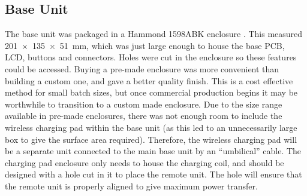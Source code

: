 \subsection{Base Unit}
The base unit was packaged in a Hammond 1598ABK enclosure \cite{hammond}. This measured \SI{201x135x51}{\milli\metre}, which was just large enough to house the base PCB, LCD, buttons and connectors. Holes were cut in the enclosure so these features could be accessed. Buying a pre-made enclosure was more convenient than building a custom one, and gave a better quality finish. This is a cost effective method for small batch sizes, but once commercial production begins it may be worthwhile to transition to a custom made enclosure. Due to the size range available in pre-made enclosures, there was not enough room to include the wireless charging pad within the base unit (as this led to an unnecessarily large box to give the surface area required). Therefore, the wireless charging pad will be a separate unit connected to the main base unit by an ``umbilical'' cable. The charging pad enclosure only needs to house the charging coil, and should be designed with a hole cut in it to place the remote unit. The hole will ensure that the remote unit is properly aligned to give maximum power transfer.\\

